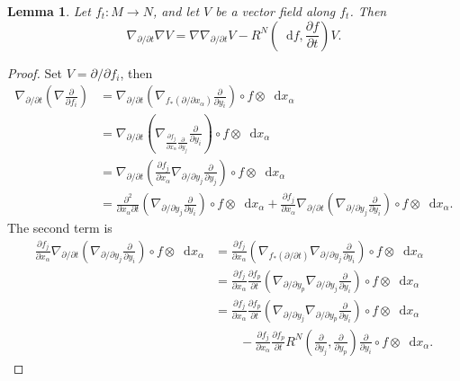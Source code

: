 \documentclass[reqno,12pt,letterpaper]{amsart}
\newcommand*\dif{\mathop{}\!\mathrm{d}}
\newcommand{\parl}{\left(}
\newcommand{\parr}{\right)}
\newtheorem{lemma}[theorem]{Lemma}
\theoremstyle{definition}
\numberwithin{equation}{section}
\begin{document}
\begin{lemma}
Let $f_t: M \to N$, and let $V$ be a vector field along $f_t$. Then 
$$\nabla_{\partial/\partial t} \nabla V = \nabla \nabla_{\partial/\partial t} V - R^N \parl \dif f, \frac{\partial f}{\partial t} \parr V.$$
\end{lemma}
\begin{proof}
Set $V = \partial/\partial f_i$, then 
\begin{align*}
\nabla_{\partial/\partial t} \parl \nabla \frac{\partial}{\partial f_i} \parr &= \nabla_{\partial/\partial t} \parl \nabla_{f_*(\partial/\partial x_\alpha)} \frac{\partial}{\partial y_i} \parr \circ f \otimes \dif x_\alpha \\
&= \nabla_{\partial/\partial t} \parl \nabla_{\frac{\partial f_j}{\partial x_\alpha} \frac{\partial}{\partial y_j}} \frac{\partial}{\partial y_i} \parr \circ f \otimes \dif x_\alpha \\
&= \nabla_{\partial/\partial t} \parl \frac{\partial f_j}{\partial x_\alpha} \nabla_{\partial/\partial y_j} \frac{\partial}{\partial y_j} \parr \circ f \otimes \dif x_\alpha \\
&= \frac{\partial^2}{\partial x_\alpha \partial t} \parl \nabla_{\partial/\partial y_j} \frac{\partial}{\partial y_i} \parr \circ f \otimes \dif x_\alpha + \frac{\partial f_j}{\partial x_\alpha} \nabla_{\partial/\partial t} \parl \nabla_{\partial/\partial y_j} \frac{\partial}{\partial y_i} \parr \circ f \otimes \dif x_\alpha.
\end{align*}
The second term is 
\begin{align*}
\frac{\partial f_j}{\partial x_\alpha} \nabla_{\partial/\partial t} \parl \nabla_{\partial/\partial y_j} \frac{\partial}{\partial y_i} \parr \circ f \otimes \dif x_\alpha &= \frac{\partial f_j}{\partial x_\alpha} \parl \nabla_{f_*(\partial/\partial t)} \nabla_{\partial/\partial y_j} \frac{\partial}{\partial y_i} \parr \circ f \otimes \dif x_\alpha \\
&= \frac{\partial f_j}{\partial x_\alpha} \frac{\partial f_p}{\partial t} \parl \nabla_{\partial/\partial y_p} \nabla_{\partial/\partial y_j} \frac{\partial}{\partial y_i} \parr \circ f \otimes \dif x_\alpha \\
&= \frac{\partial f_j}{\partial x_\alpha} \frac{\partial f_p}{\partial t} \parl \nabla_{\partial/\partial y_j} \nabla_{\partial/\partial y_p} \frac{\partial}{\partial y_i} \parr \circ f \otimes \dif x_\alpha \\
&\qquad - \frac{\partial f_j}{\partial x_\alpha} \frac{\partial f_p}{\partial t} R^N \parl \frac{\partial}{\partial y_j}, \frac{\partial}{\partial y_p} \parr \frac{\partial}{\partial y_i} \circ f \otimes \dif x_\alpha.

\end{align*}
\end{proof}
\end{document}
